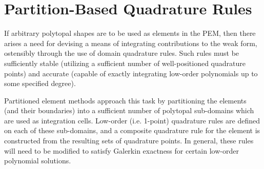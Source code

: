 

\section{Partition-Based Quadrature Rules}

		
If arbitrary polytopal shapes are to be used as elements in the PEM, then there arises a need for devising a means of integrating contributions to the weak form, ostensibly through the use of domain quadrature rules. Such rules must be sufficiently stable (utilizing a sufficient number of well-positioned quadrature points) and accurate (capable of exactly integrating low-order polynomials up to some specified degree).
	
Partitioned element methods approach this task by partitioning the elements (and their boundaries) into a sufficient number of polytopal sub-domains which are used as integration cells. Low-order (i.e. 1-point) quadrature rules are defined on each of these sub-domains, and a composite quadrature rule for the element is constructed from the resulting sets of quadrature points. In general, these rules will need to be modified to satisfy Galerkin exactness for certain low-order polynomial solutions.
	
